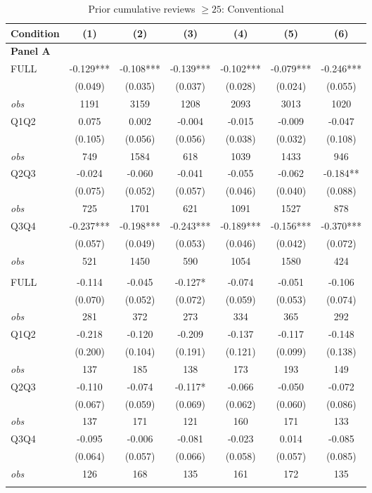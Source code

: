 \begin{table}[!htbp]
\centering
\caption{Prior cumulative reviews $\geq25$: Conventional}
\begin{tabular}{lcccccc}
\toprule
Condition & (1) & (2) & (3) & (4) & (5) & (6) \\
\midrule
\multicolumn{7}{l}{\textbf{Panel A}} \\

FULL & -0.129*** & -0.108*** & -0.139*** & -0.102*** & -0.079*** & -0.246*** \\
 & (0.049) & (0.035) & (0.037) & (0.028) & (0.024) & (0.055) \\
\textit{obs} & 1191 & 3159 & 1208 & 2093 & 3013 & 1020 \\
Q1Q2 & 0.075 & 0.002 & -0.004 & -0.015 & -0.009 & -0.047 \\
 & (0.105) & (0.056) & (0.056) & (0.038) & (0.032) & (0.108) \\
\textit{obs} & 749 & 1584 & 618 & 1039 & 1433 & 946 \\
Q2Q3 & -0.024 & -0.060 & -0.041 & -0.055 & -0.062 & -0.184** \\
 & (0.075) & (0.052) & (0.057) & (0.046) & (0.040) & (0.088) \\
\textit{obs} & 725 & 1701 & 621 & 1091 & 1527 & 878 \\
Q3Q4 & -0.237*** & -0.198*** & -0.243*** & -0.189*** & -0.156*** & -0.370*** \\
 & (0.057) & (0.049) & (0.053) & (0.046) & (0.042) & (0.072) \\
\textit{obs} & 521 & 1450 & 590 & 1054 & 1580 & 424 \\
\addlinespace
\multicolumn{7}{l}{\textbf{Panel B}} \\

FULL & -0.114 & -0.045 & -0.127* & -0.074 & -0.051 & -0.106 \\
 & (0.070) & (0.052) & (0.072) & (0.059) & (0.053) & (0.074) \\
\textit{obs} & 281 & 372 & 273 & 334 & 365 & 292 \\
Q1Q2 & -0.218 & -0.120 & -0.209 & -0.137 & -0.117 & -0.148 \\
 & (0.200) & (0.104) & (0.191) & (0.121) & (0.099) & (0.138) \\
\textit{obs} & 137 & 185 & 138 & 173 & 193 & 149 \\
Q2Q3 & -0.110 & -0.074 & -0.117* & -0.066 & -0.050 & -0.072 \\
 & (0.067) & (0.059) & (0.069) & (0.062) & (0.060) & (0.086) \\
\textit{obs} & 137 & 171 & 121 & 160 & 171 & 133 \\
Q3Q4 & -0.095 & -0.006 & -0.081 & -0.023 & 0.014 & -0.085 \\
 & (0.064) & (0.057) & (0.066) & (0.058) & (0.057) & (0.085) \\
\textit{obs} & 126 & 168 & 135 & 161 & 172 & 135 \\
\addlinespace
\multicolumn{7}{l}{\textbf{Panel C}} \\


\end{tabular}
\end{table}
